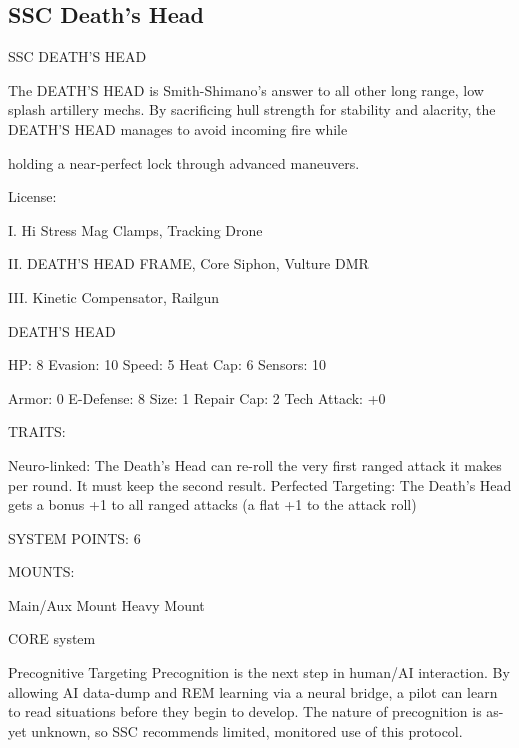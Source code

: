 \subsection{SSC Death's Head}

                                         SSC DEATH’S HEAD  

The DEATH’S HEAD is Smith-Shimano’s answer to all other long range, low splash artillery mechs. By  
sacrificing hull strength for stability and alacrity, the DEATH’S HEAD manages to avoid incoming fire while  

holding a near-perfect lock through advanced maneuvers.   

                                                    License:
 
I. Hi Stress Mag Clamps, Tracking Drone
 
II. DEATH’S HEAD FRAME, Core Siphon, Vulture DMR
 
III. Kinetic Compensator, Railgun
 

                                               DEATH’S HEAD 

  HP: 8           Evasion: 10                           Speed: 5            Heat Cap: 6        Sensors: 10 

  Armor: 0        E-Defense: 8                          Size: 1             Repair Cap: 2      Tech Attack:  
                                                                                               +0 

                                                     TRAITS: 

  Neuro-linked: The Death’s Head can re-roll the very first ranged attack it makes per round. It must keep 
  the second result. 
  Perfected Targeting: The Death’s Head gets a bonus +1 to all ranged attacks (a flat +1 to the attack 
  roll) 

                                              SYSTEM POINTS: 6 

                                                    MOUNTS: 

  Main/Aux Mount                     Heavy Mount 

                                                  CORE system 

                                                                                                               


                                                 Precognitive Targeting  
  Precognition is the next step in human/AI interaction. By allowing AI data-dump and REM learning via a  
  neural bridge, a pilot can learn to read situations before they begin to develop. The nature of  
  precognition is as-yet unknown, so SSC recommends limited, monitored use of this protocol.   

